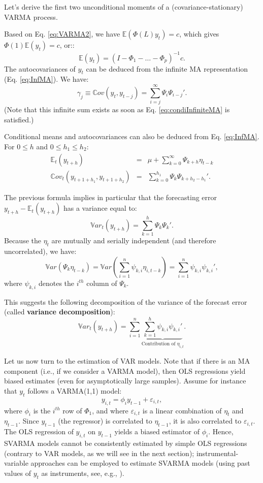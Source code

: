 \documentclass[
  12pt,
]{book}
\theoremstyle{definition}
\theoremstyle{definition}
\theoremstyle{definition}
\theoremstyle{definition}
\theoremstyle{remark}
\begin{document}
Let's derive the first two unconditional moments of a (covariance-stationary) VARMA process.

Based on Eq. \eqref{eq:VARMA2}, we have \(\mathbb{E}(\Phi(L)y_t)=c\), which gives \(\Phi(1)\mathbb{E}(y_t)=c\), or::
\[
\mathbb{E}(y_t) = (I - \Phi_1 - \dots - \Phi_p)^{-1}c.
\]
The autocovariances of \(y_t\) can be deduced from the infinite MA representation (Eq. \eqref{eq:InfMA}). We have:
\[
\gamma_j \equiv \mathbb{C}ov(y_t,y_{t-j}) = \sum_{i=j}^\infty \Psi_i \Psi_{i-j}'.
\]
(Note that this infinite sum exists as soon as Eq. \eqref{eq:condiInfiniteMA} is satisfied.)

Conditional means and autocovariances can also be deduced from Eq. \eqref{eq:InfMA}. For \(0 \le h\) and \(0 \le h_1 \le h_2\):
\begin{eqnarray*}
\mathbb{E}_t(y_{t+h}) &=& \mu + \sum_{k=0}^\infty \Psi_{k+h} \eta_{t-k} \\
\mathbb{C}ov_t(y_{t+1+h_1},y_{t+1+h_2}) &=& \sum_{k=0}^{h_1} \Psi_{k}\Psi_{k+h_2-h_1}'.
\end{eqnarray*}

The previous formula implies in particular that the forecasting error \(y_{t+h} - \mathbb{E}_t(y_{t+h})\) has a variance equal to:
\[
\mathbb{V}ar_t(y_{t+h}) = \sum_{k=1}^{h} \Psi_{k}\Psi_{k}'.
\]
Because the \(\eta_t\) are mutually and serially independent (and therefore uncorrelated), we have:
\[
\mathbb{V}ar(\Psi_k \eta_{t-k}) = \mathbb{V}ar\left(\sum_{i=1}^n \psi_{k,i} \eta_{i,t-k}\right)  = \sum_{i=1}^n \psi_{k,i}\psi_{k,i}',
\]
where \(\psi_{k,i}\) denotes the \(i^{th}\) column of \(\Psi_k\).

This suggests the following decomposition of the variance of the forecast error (called \textbf{variance decomposition}):
\[
\mathbb{V}ar_t(y_{t+h}) = \sum_{i=1}^n \underbrace{\sum_{k=1}^{h}  \psi_{k,i}\psi_{k,i}'}_{\mbox{Contribution of $\eta_{i,t}$}}.
\]

Let us now turn to the estimation of VAR models. Note that if there is an MA component (i.e., if we consider a VARMA model), then OLS regressions yield biased estimates (even for asymptotically large samples). Assume for instance that \(y_t\) follows a VARMA(1,1) model:
\[
y_{i,t} = \phi_i y_{t-1} + \varepsilon_{i,t},
\]
where \(\phi_i\) is the \(i^{th}\) row of \(\Phi_1\), and where \(\varepsilon_{i,t}\) is a linear combination of \(\eta_t\) and \(\eta_{t-1}\). Since \(y_{t-1}\) (the regressor) is correlated to \(\eta_{t-1}\), it is also correlated to \(\varepsilon_{i,t}\). The OLS regression of \(y_{i,t}\) on \(y_{t-1}\) yields a biased estimator of \(\phi_i\). Hence, SVARMA models cannot be consistently estimated by simple OLS regressions (contrary to VAR models, as we will see in the next section); instrumental-variable approaches can be employed to estimate SVARMA models (using past values of \(y_t\) as instruments, see, e.g., \citet{Gourieroux_Monfort_Renne_2020}).
\end{document}
